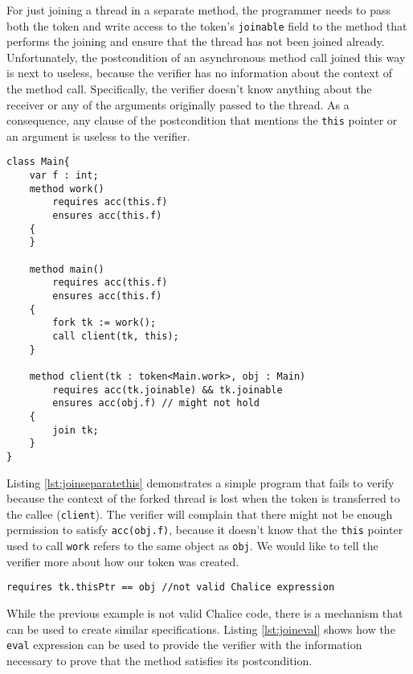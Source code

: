 For just joining a thread in a separate method, the programmer needs to pass both the token and write access to the token's \lstinline!joinable! field to the method that performs the joining 
and ensure that the thread has not been joined already.
Unfortunately, the postcondition of an asynchronous method call joined this way is next to useless, because the verifier has no information about the context of the method call. 
Specifically, the verifier doesn't know anything about the receiver or any of the arguments originally passed to the thread. 
As a consequence, any clause of the postcondition that mentions the \lstinline!this! pointer or an argument is useless to the verifier.

\begin{lstlisting}[float,caption={Limitations with joining in separate methods},label=lst:joinseparatethis,language=chalice]
class Main{
    var f : int;
    method work()
        requires acc(this.f)
        ensures acc(this.f)
    {
    }

    method main()
        requires acc(this.f)
        ensures acc(this.f)
    {
        fork tk := work();
        call client(tk, this);
    }

    method client(tk : token<Main.work>, obj : Main)
        requires acc(tk.joinable) && tk.joinable
        ensures acc(obj.f) // might not hold
    {
        join tk;
    }
}
\end{lstlisting}

Listing \ref{lst:joinseparatethis} demonstrates a simple program that fails to verify because the context of the forked thread is lost when the token is transferred to the callee (\lstinline!client!). 
The verifier will complain that there might not be enough permission to satisfy \lstinline!acc(obj.f)!, because it doesn't know that the \lstinline!this! pointer used to call \lstinline!work! refers to the same object as \lstinline!obj!.
We would like to tell the verifier more about how our token was created. 

\begin{lstlisting}[language=chalice]
        requires tk.thisPtr == obj //not valid Chalice expression
\end{lstlisting}

While the previous example is not valid Chalice code, there is a mechanism that can be used to create similar specifications. Listing \ref{lst:joineval} shows how the \lstinline!eval! expression can be used to provide the verifier with the information necessary to prove that the method satisfies its postcondition. 

